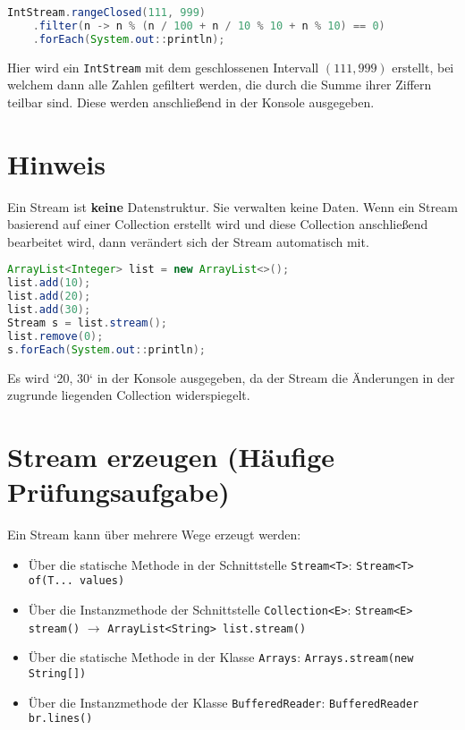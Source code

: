 \begin{lstlisting}[language=Java, caption={Beispiel eines IntStreams}]
IntStream.rangeClosed(111, 999)
    .filter(n -> n % (n / 100 + n / 10 % 10 + n % 10) == 0)
    .forEach(System.out::println);
\end{lstlisting}

Hier wird ein \lstinline{IntStream} mit dem geschlossenen Intervall \((111,
999)\) erstellt, bei welchem dann alle Zahlen gefiltert werden, die durch die
Summe ihrer Ziffern teilbar sind. Diese werden anschließend in der Konsole
ausgegeben.

\section{Hinweis}

Ein Stream ist \textbf{keine} Datenstruktur. Sie verwalten keine Daten. Wenn
ein Stream basierend auf einer Collection erstellt wird und diese Collection
anschließend bearbeitet wird, dann verändert sich der Stream automatisch mit.

\begin{lstlisting}[language=Java, caption={Stream über Collection}]
ArrayList<Integer> list = new ArrayList<>();
list.add(10);
list.add(20);
list.add(30);
Stream s = list.stream();
list.remove(0);
s.forEach(System.out::println);
\end{lstlisting}
Es wird `20, 30` in der Konsole ausgegeben, da der Stream die Änderungen in der
zugrunde liegenden Collection widerspiegelt.

\section{Stream erzeugen (Häufige Prüfungsaufgabe)}

Ein Stream kann über mehrere Wege erzeugt werden:

\begin{itemize}
    \item Über die statische Methode in der Schnittstelle \lstinline{Stream<T>}:
          \lstinline{Stream<T> of(T... values)}
    \item Über die Instanzmethode der Schnittstelle \lstinline{Collection<E>}:
          \lstinline{Stream<E> stream()} \(\rightarrow\) \lstinline{ArrayList<String> list.stream()}
    \item Über die statische Methode in der Klasse \lstinline{Arrays}:
          \lstinline{Arrays.stream(new String[])}
    \item Über die Instanzmethode der Klasse \lstinline{BufferedReader}:
          \lstinline{BufferedReader br.lines()}
\end{itemize}

